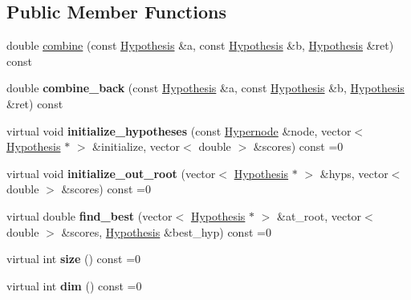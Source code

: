\subsection*{Public Member Functions}
\begin{DoxyCompactItemize}
\item 
double \hyperlink{classScarab_1_1HG_1_1Controller_a34cfe4b8e7496ffca1cedf64cb3f0a73}{combine} (const \hyperlink{structScarab_1_1HG_1_1Hypothesis}{Hypothesis} \&a, const \hyperlink{structScarab_1_1HG_1_1Hypothesis}{Hypothesis} \&b, \hyperlink{structScarab_1_1HG_1_1Hypothesis}{Hypothesis} \&ret) const 
\item 
\hypertarget{classScarab_1_1HG_1_1Controller_a4b596f04765ad11b691e29383f5fbc3b}{
double {\bfseries combine\_\-back} (const \hyperlink{structScarab_1_1HG_1_1Hypothesis}{Hypothesis} \&a, const \hyperlink{structScarab_1_1HG_1_1Hypothesis}{Hypothesis} \&b, \hyperlink{structScarab_1_1HG_1_1Hypothesis}{Hypothesis} \&ret) const }
\label{classScarab_1_1HG_1_1Controller_a4b596f04765ad11b691e29383f5fbc3b}

\item 
\hypertarget{classScarab_1_1HG_1_1Controller_a5019e9591e6d4e5e29eb4ca6ac42d056}{
virtual void {\bfseries initialize\_\-hypotheses} (const \hyperlink{classScarab_1_1HG_1_1Hypernode}{Hypernode} \&node, vector$<$ \hyperlink{structScarab_1_1HG_1_1Hypothesis}{Hypothesis} $\ast$ $>$ \&initialize, vector$<$ double $>$ \&scores) const =0}
\label{classScarab_1_1HG_1_1Controller_a5019e9591e6d4e5e29eb4ca6ac42d056}

\item 
\hypertarget{classScarab_1_1HG_1_1Controller_a34e4f087d77d06ee27fff2d3a8435473}{
virtual void {\bfseries initialize\_\-out\_\-root} (vector$<$ \hyperlink{structScarab_1_1HG_1_1Hypothesis}{Hypothesis} $\ast$ $>$ \&hyps, vector$<$ double $>$ \&scores) const =0}
\label{classScarab_1_1HG_1_1Controller_a34e4f087d77d06ee27fff2d3a8435473}

\item 
\hypertarget{classScarab_1_1HG_1_1Controller_ac4a38bf968379d3dc3f2b95cffabf540}{
virtual double {\bfseries find\_\-best} (vector$<$ \hyperlink{structScarab_1_1HG_1_1Hypothesis}{Hypothesis} $\ast$ $>$ \&at\_\-root, vector$<$ double $>$ \&scores, \hyperlink{structScarab_1_1HG_1_1Hypothesis}{Hypothesis} \&best\_\-hyp) const =0}
\label{classScarab_1_1HG_1_1Controller_ac4a38bf968379d3dc3f2b95cffabf540}

\item 
\hypertarget{classScarab_1_1HG_1_1Controller_a3498a09d093e6c6ed993e309db51480a}{
virtual int {\bfseries size} () const =0}
\label{classScarab_1_1HG_1_1Controller_a3498a09d093e6c6ed993e309db51480a}

\item 
\hypertarget{classScarab_1_1HG_1_1Controller_ab4282178c6b8d3670134ab0519eda518}{
virtual int {\bfseries dim} () const =0}
\label{classScarab_1_1HG_1_1Controller_ab4282178c6b8d3670134ab0519eda518}

\end{DoxyCompactItemize}


